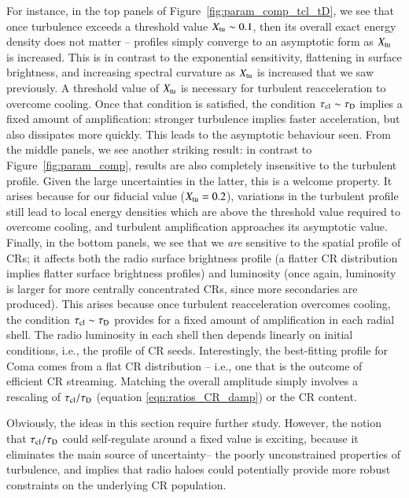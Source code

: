 \documentclass[fleqn,usenatbib,useAMS]{mnras}
\begin{document}
For instance, in the top panels of Figure~\ref{fig:param_comp_tcl_tD}, we see that once turbulence exceeds a threshold value $X_{\rm tu} \sim 0.1$, then its overall exact energy density does not matter -- profiles simply converge to an asymptotic form as $X_{\rm tu}$ is increased. This is in contrast to the exponential sensitivity, flattening in surface brightness, and increasing spectral curvature as $X_{\rm tu}$ is increased that we saw previously. A threshold value of $X_{\rm tu}$ is necessary for turbulent reacceleration to overcome cooling. Once that condition is satisfied, the condition $\tau_{\rm cl} \sim \tau_{\rm D}$ implies a fixed amount of amplification: stronger turbulence implies faster acceleration, but also dissipates more quickly. This leads to the asymptotic behaviour seen. From the middle panels, we see another striking result: in contrast to Figure~\ref{fig:param_comp}, results are also completely insensitive to the turbulent profile. Given the large uncertainties in the latter, this is a welcome property. It arises because for our fiducial value ($X_{\rm tu} = 0.2$), variations in the turbulent profile still lead to local energy densities which are above the threshold value required to overcome cooling, and turbulent amplification approaches its asymptotic value. Finally, in the bottom panels, we see that we {\it are} sensitive to the spatial profile of CRs; it affects both the radio surface brightness profile (a flatter CR distribution implies flatter surface brightness profiles) and luminosity (once again, luminosity is larger for more centrally concentrated CRs, since more secondaries are produced). This arises because once turbulent reacceleration overcomes cooling, the condition $\tau_{\rm cl} \sim \tau_{\rm D}$ provides for a fixed amount of amplification in each radial shell. The radio luminosity in each shell then depends linearly on initial conditions, i.e., the profile of CR seeds. Interestingly, the best-fitting profile for Coma comes from a flat CR distribution -- i.e., one that is the outcome of efficient CR streaming. Matching the overall amplitude simply involves a rescaling of $\tau_{\rm cl}/\tau_{\rm D}$ (equation \ref{eqn:ratios_CR_damp}) or the CR content.  

Obviously, the ideas in this section require further study. However, the notion that $\tau_{\rm cl}/\tau_{\rm D}$ could self-regulate around a fixed value is exciting, because it eliminates the main source of uncertainty-- the poorly unconstrained properties of turbulence, and implies that radio haloes could potentially provide more robust constraints on the underlying CR population.  
\end{document}
